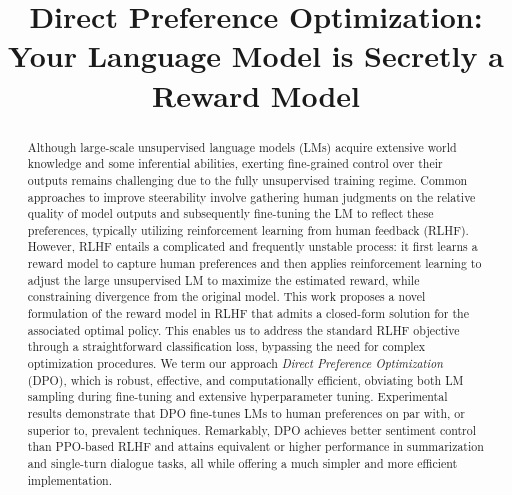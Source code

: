 \title{Direct Preference Optimization: Your Language Model is Secretly a Reward Model}

\begin{abstract}
Although large-scale unsupervised language models (LMs) acquire extensive world knowledge and some inferential abilities, exerting fine-grained control over their outputs remains challenging due to the fully unsupervised training regime. Common approaches to improve steerability involve gathering human judgments on the relative quality of model outputs and subsequently fine-tuning the LM to reflect these preferences, typically utilizing reinforcement learning from human feedback (RLHF). However, RLHF entails a complicated and frequently unstable process: it first learns a reward model to capture human preferences and then applies reinforcement learning to adjust the large unsupervised LM to maximize the estimated reward, while constraining divergence from the original model. This work proposes a novel formulation of the reward model in RLHF that admits a closed-form solution for the associated optimal policy. This enables us to address the standard RLHF objective through a straightforward classification loss, bypassing the need for complex optimization procedures. We term our approach \textit{Direct Preference Optimization} (DPO), which is robust, effective, and computationally efficient, obviating both LM sampling during fine-tuning and extensive hyperparameter tuning. Experimental results demonstrate that DPO fine-tunes LMs to human preferences on par with, or superior to, prevalent techniques. Remarkably, DPO achieves better sentiment control than PPO-based RLHF and attains equivalent or higher performance in summarization and single-turn dialogue tasks, all while offering a much simpler and more efficient implementation.
\end{abstract}

